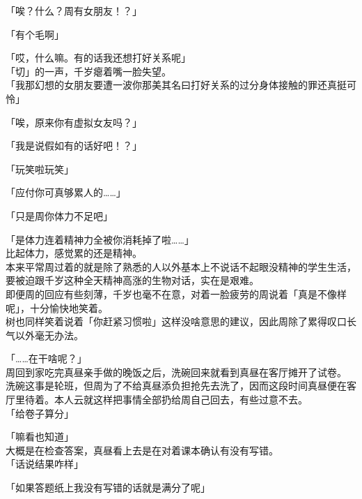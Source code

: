 「唉？什么？周有女朋友！？」

「有个毛啊」

「哎，什么嘛。有的话我还想打好关系呢」\\

「切」的一声，千岁瘪着嘴一脸失望。\\

「我那幻想的女朋友要遭一波你那美其名曰打好关系的过分身体接触的罪还真挺可怜」

「唉，原来你有虚拟女友吗？」

「我是说假如有的话好吧！？」

「玩笑啦玩笑」

「应付你可真够累人的……」

「只是周你体力不足吧」

「是体力连着精神力全被你消耗掉了啦……」\\

比起体力，感觉累的还是精神。\\

本来平常周过着的就是除了熟悉的人以外基本上不说话不起眼没精神的学生生活，要被迫跟千岁这种全天精神高涨的生物对话，实在是艰难。\\

即便周的回应有些刻薄，千岁也毫不在意，对着一脸疲劳的周说着「真是不像样呢」，十分愉快地笑着。\\

树也同样笑着说着「你赶紧习惯啦」这样没啥意思的建议，因此周除了累得叹口长气以外毫无办法。\\

\vspace{2\baselineskip}

「……在干啥呢？」\\

周回到家吃完真昼亲手做的晚饭之后，洗碗回来就看到真昼在客厅摊开了试卷。\\

洗碗这事是轮班，但周为了不给真昼添负担抢先去洗了，因而这段时间真昼便在客厅里待着。本人云就这样把事情全部扔给周自己回去，有些过意不去。\\

「给卷子算分」

「嘛看也知道」\\

大概是在检查答案，真昼看上去是在对着课本确认有没有写错。\\

「话说结果咋样」

「如果答题纸上我没有写错的话就是满分了呢」

